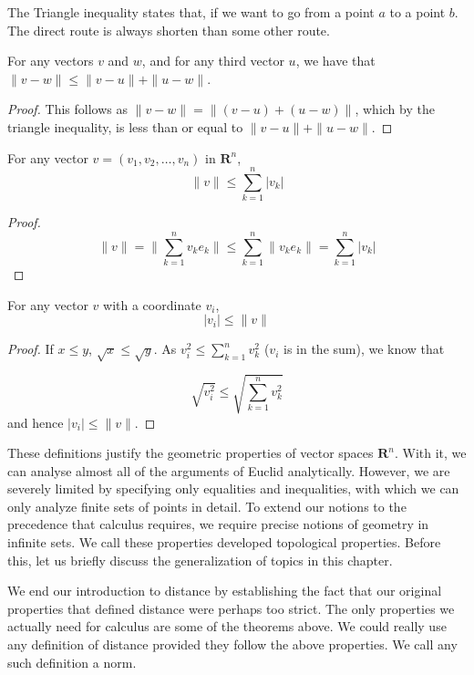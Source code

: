 The Triangle inequality states that, if we want to go from a point $a$ to a point $b$. The direct route is always shorten than some other route.

\begin{corollary}
  For any vectors $v$ and $w$, and for any third vector $u$, we have that $\|v - w\| \leq \|v - u\| + \|u - w\|$.
\end{corollary}
\theoremstyle{definition}
\begin{proof}
  This follows as $\| v - w \| = \| (v - u) + (u - w) \|$, which by the triangle inequality, is less than or equal to $\| v - u \| + \| u - w \|$.
\end{proof}

\begin{corollary}
  For any vector $v = (v_1, v_2, \dots, v_n)$ in $\mathbf{R}^n$,
  \[ \|v\| \leq \sum_{k = 1}^n |v_k| \]
\end{corollary}
\begin{proof}
  \[ \| v \| = \| \sum_{k = 1}^n v_k e_k \| \leq \sum_{k = 1}^n \| v_k e_k \| = \sum_{k = 1}^n | v_k | \]
\end{proof}

\begin{lemma}
  For any vector $v$ with a coordinate $v_i$,
  \[ |v_i| \leq \| v \| \]
\end{lemma}
\begin{proof}
  If $x \leq y$, $\sqrt{x} \leq \sqrt{y}$. As $v_i^2 \leq \sum_{k=1}^n v_k^2$ ($v_i$ is in the sum), we know that
  \theoremstyle{definition}
  \[ \sqrt{v_i^2} \leq \sqrt{\sum_{k=1}^n v_k^2} \]
  and hence $|v_i| \leq \| v \|$.
\end{proof}

These definitions justify the geometric properties of vector spaces $\mathbf{R}^n$. With it, we can analyse almost all of the arguments of Euclid analytically. However, we are severely limited by specifying only equalities and inequalities, with which we can only analyze finite sets of points in detail. To extend our notions to the precedence that calculus requires, we require precise notions of geometry in infinite sets. We call these properties developed topological properties. Before this, let us briefly discuss the generalization of topics in this chapter.

We end our introduction to distance by establishing the fact that our original properties that defined distance were perhaps too strict. The only properties we actually need for calculus are some of the theorems above. We could really use any definition of distance provided they follow the above properties. We call any such definition a norm.

